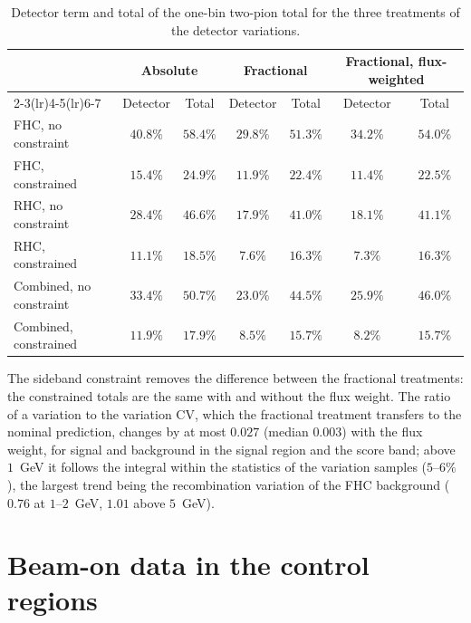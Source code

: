\documentclass[11pt,a4paper]{article}
\begin{document}
\begin{table}[H]
  \centering
  \caption{Detector term and total of the one-bin two-pion total for the three treatments of the
    detector variations.}
  \label{tab:detvar}
  \small
  \begin{tabular}{lcccccc}
    \toprule
    & \multicolumn{2}{c}{Absolute} & \multicolumn{2}{c}{Fractional} & \multicolumn{2}{c}{Fractional, flux-weighted} \\
    \cmidrule(lr){2-3}\cmidrule(lr){4-5}\cmidrule(lr){6-7}
    & Detector & Total & Detector & Total & Detector & Total \\
    \midrule
    FHC, no constraint       & $40.8\%$ & $58.4\%$ & $29.8\%$ & $51.3\%$ & $34.2\%$ & $54.0\%$ \\
    FHC, constrained         & $15.4\%$ & $24.9\%$ & $11.9\%$ & $22.4\%$ & $11.4\%$ & $22.5\%$ \\
    RHC, no constraint       & $28.4\%$ & $46.6\%$ & $17.9\%$ & $41.0\%$ & $18.1\%$ & $41.1\%$ \\
    RHC, constrained         & $11.1\%$ & $18.5\%$ & $7.6\%$  & $16.3\%$ & $7.3\%$  & $16.3\%$ \\
    Combined, no constraint  & $33.4\%$ & $50.7\%$ & $23.0\%$ & $44.5\%$ & $25.9\%$ & $46.0\%$ \\
    Combined, constrained    & $11.9\%$ & $17.9\%$ & $8.5\%$  & $15.7\%$ & $8.2\%$  & $15.7\%$ \\
    \bottomrule
  \end{tabular}
\end{table}

The sideband constraint removes the difference between the fractional treatments: the constrained totals
are the same with and without the flux weight. The ratio of a variation to the variation CV, which the
fractional treatment transfers to the nominal prediction, changes by at most $0.027$ (median $0.003$) with the
flux weight, for signal and background in the signal region and the score band; above $1$~GeV it follows the
integral within the statistics of the variation samples ($5$--$6\%$), the largest trend being the recombination
variation of the FHC background ($0.76$ at $1$--$2$~GeV, $1.01$ above $5$~GeV).

\section{Beam-on data in the control regions}
\label{sec:crdata}
\end{document}
